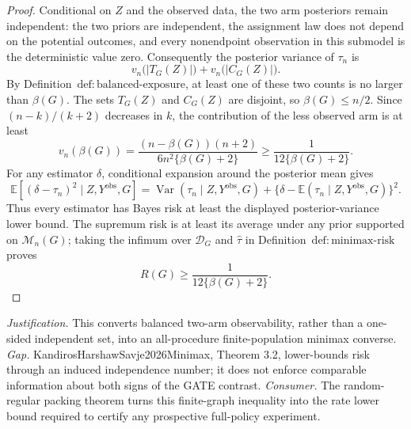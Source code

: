 \documentclass{article}
\begin{document}
\begin{proof}
Conditional on \(Z\) and the observed data, the two arm posteriors remain independent: the two priors are independent, the assignment law does not depend on the potential outcomes, and every nonendpoint observation in this submodel is the deterministic value zero.  Consequently the posterior variance of \(\tau_n\) is
\[
v_n\bigl(|T_G(Z)|\bigr)+v_n\bigl(|C_G(Z)|\bigr).
\]
By Definition~\(\mathrm{def{:}balanced\mbox{-}exposure}\), at least one of these two counts is no larger than \(\beta(G)\).  The sets \(T_G(Z)\) and \(C_G(Z)\) are disjoint, so \(\beta(G)\le n/2\).  Since \((n-k)/(k+2)\) decreases in \(k\), the contribution of the less observed arm is at least
\[
v_n(\beta(G))
=\frac{(n-\beta(G))(n+2)}{6n^2\{\beta(G)+2\}}
\ge\frac1{12\{\beta(G)+2\}}.
\]
For any estimator \(\delta\), conditional expansion around the posterior mean gives
\[
\mathbb E[(\delta-\tau_n)^2\mid Z,Y^{\mathrm{obs}},G]
=\operatorname{Var}(\tau_n\mid Z,Y^{\mathrm{obs}},G)
+\{\delta-\mathbb E(\tau_n\mid Z,Y^{\mathrm{obs}},G)\}^2.
\]
Thus every estimator has Bayes risk at least the displayed posterior-variance lower bound.  The supremum risk is at least its average under any prior supported on \(\mathcal M_n(G)\); taking the infimum over \(\mathcal D_G\) and \(\widehat\tau\) in Definition~\(\mathrm{def{:}minimax\mbox{-}risk}\) proves
\[
R(G)\ge\frac1{12\{\beta(G)+2\}}.
\]
\end{proof}
\par\smallskip\noindent \textit{Justification.} This converts balanced two-arm observability, rather than a one-sided independent set, into an all-procedure finite-population minimax converse. \textit{Gap.} KandirosHarshawSavje2026Minimax, Theorem 3.2, lower-bounds risk through an induced independence number; it does not enforce comparable information about both signs of the GATE contrast. \textit{Consumer.} The random-regular packing theorem turns this finite-graph inequality into the rate lower bound required to certify any prospective full-policy experiment.
\end{document}
